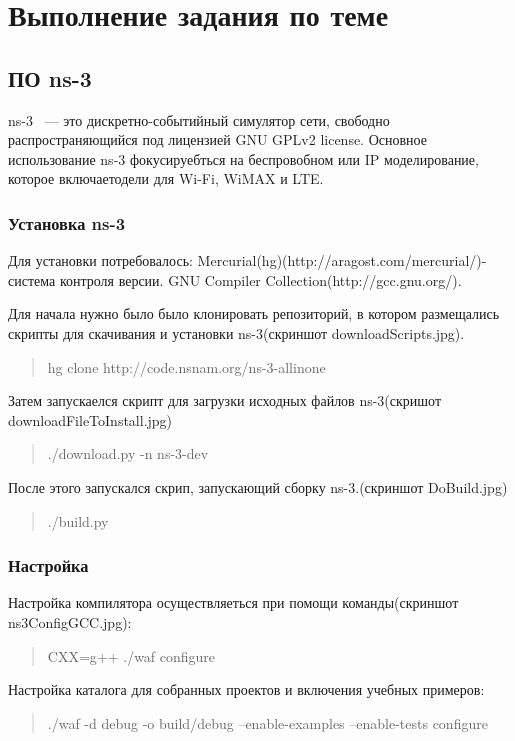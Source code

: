 \documentclass[14pt,a4paper]{article}
\begin{document}
\section{Выполнение задания по теме}
\subsection{ПО ns-3}
ns-3\cite{ns3W:website} ~--- это дискретно-событийный симулятор сети, свободно
распространяющийся под лицензией  GNU GPLv2 license. Основное использование ns-3 фокусируебться на
беспровобном или IP моделирование, которое включаетодели для Wi-Fi, WiMAX и LTE.
\subsubsection{Установка ns-3}
Для установки потребовалось:
Mercurial(hg)(http://aragost.com/mercurial/)-система контроля версии.
GNU Compiler Collection(http://gcc.gnu.org/).

Для начала нужно было было клонировать репозиторий, в котором размещались
скрипты для скачивания и установки ns-3(скриншот downloadScripts.jpg).
\begin{quote}
hg clone http://code.nsnam.org/ns-3-allinone
\end{quote}
\vspace{0.75cm}
Затем запускаелся скрипт для загрузки исходных файлов ns-3(скришот
downloadFileToInstall.jpg)
\begin{quote}
./download.py -n ns-3-dev
\end{quote}
\vspace{0.75cm}
После этого запускался скрип, запускающий сборку ns-3.(скриншот DoBuild.jpg) 
\begin{quote}
./build.py
\end{quote}
\vspace{0.75cm}
\subsubsection{Настройка}
Настройка компилятора осуществляеться при помощи команды(скриншот
ns3ConfigGCC.jpg):
\begin{quote}
CXX=g++ ./waf configure
\end{quote}
\vspace{0.75cm}
Настройка каталога для собранных проектов и включения учебных примеров:
\begin{quote}
./waf -d debug -o build/debug --enable-examples --enable-tests configure
\end{quote}
\vspace{0.75cm}
\end{document}
